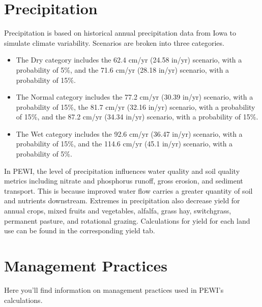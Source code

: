 \documentclass[11pt]{article}
\begin{document}
\section{Precipitation}
Precipitation is based on historical annual precipitation data from Iowa to simulate climate variability. Scenarios are broken into three categories. 
\begin{itemize}
  \item The Dry category includes the 62.4 cm/yr (24.58 in/yr) scenario, with a probability of 5\%, and the 71.6 cm/yr (28.18 in/yr) scenario, with a probability of 15\%. 
  \item The Normal category includes the 77.2 cm/yr (30.39 in/yr) scenario, with a probability of 15\%, the 81.7 cm/yr (32.16 in/yr) scenario, with a probability of 15\%, and the 87.2 cm/yr (34.34 in/yr) scenario, with a probability of 15\%.
  \item The Wet category includes the 92.6 cm/yr (36.47 in/yr) scenario, with a probability of 15\%, and the 114.6 cm/yr (45.1 in/yr) scenario, with a probability of 5\%.
\end{itemize}

In PEWI, the level of precipitation influences water quality and soil quality metrics including nitrate and phosphorus runoff, gross erosion, and sediment transport. This is because improved water flow carries a greater quantity of soil and nutrients downstream. Extremes in precipitation also decrease yield for annual crops, mixed fruits and vegetables, alfalfa, grass hay, switchgrass, permanent pasture, and rotational grazing.\cite{33}  Calculations for yield for each land use can be found in the corresponding yield tab.


\newpage
\section{Management Practices}
Here you’ll find information on management practices used in PEWI’s calculations.
\end{document}
